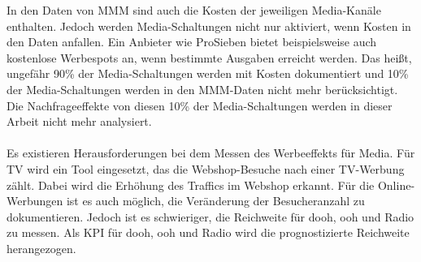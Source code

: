 In den Daten von \ac{MMM} sind auch die Kosten der jeweiligen Media-Kanäle enthalten. Jedoch werden Media-Schaltungen nicht nur aktiviert, wenn Kosten in den Daten anfallen. Ein Anbieter wie ProSieben bietet beispielsweise auch kostenlose Werbespots an, wenn bestimmte Ausgaben erreicht werden. Das heißt, ungefähr 90\% der Media-Schaltungen werden mit Kosten dokumentiert und 10\% der Media-Schaltungen werden in den \ac{MMM}-Daten nicht mehr berücksichtigt. Die Nachfrageeffekte von diesen 10\% der Media-Schaltungen werden in dieser Arbeit nicht mehr analysiert. \\\\
Es existieren Herausforderungen bei dem Messen des Werbeeffekts für Media. Für TV wird ein Tool eingesetzt, das die Webshop-Besuche nach einer TV-Werbung zählt. Dabei wird die Erhöhung des Traffics im Webshop erkannt. Für die Online-Werbungen ist es auch möglich, die Veränderung der Besucheranzahl zu dokumentieren. Jedoch ist es schwieriger, die Reichweite für \ac{dooh}, \ac{ooh} und Radio zu messen. Als \ac{KPI} für \ac{dooh}, \ac{ooh} und Radio wird die prognostizierte Reichweite herangezogen.
